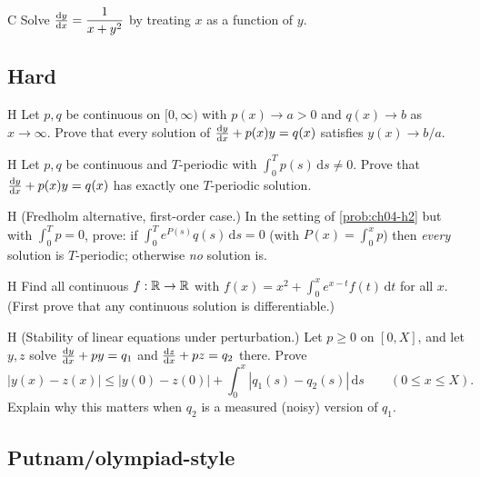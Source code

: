 \begin{problem}{C}\label{prob:ch04-c8}
Solve $\frac{\mathrm{d}y}{\mathrm{d}x} = \dfrac{1}{x + y^2}$ by treating $x$ as a function of $y$.
\end{problem}

\subsection*{Hard}

\begin{problem}{H}\label{prob:ch04-h1}
Let $p, q$ be continuous on $[0,\infty)$ with $p(x)\to a>0$ and $q(x)\to b$ as
$x\to\infty$. Prove that every solution of $\frac{\mathrm{d}y}{\mathrm{d}x} + p(x)y = q(x)$ satisfies
$y(x)\to b/a$.
\end{problem}

\begin{problem}{H}\label{prob:ch04-h2}
Let $p,q$ be continuous and $T$-periodic with $\int_0^Tp(s)\,\mathrm{d}s\neq0$.
Prove that $\frac{\mathrm{d}y}{\mathrm{d}x} + p(x)y = q(x)$ has exactly one $T$-periodic solution.
\end{problem}

\begin{problem}{H}\label{prob:ch04-h3}
(Fredholm alternative, first-order case.) In the setting of \cref{prob:ch04-h2}
but with $\int_0^Tp = 0$, prove: if
$\int_0^Te^{P(s)}q(s)\,\mathrm{d}s = 0$ (with $P(x) = \int_0^xp$) then
\emph{every} solution is $T$-periodic; otherwise \emph{no} solution is.
\end{problem}

\begin{problem}{H}\label{prob:ch04-h4}
Find all continuous $f:\mathbb{R}\to\mathbb{R}$ with
$\displaystyle f(x) = x^2 + \int_0^x e^{x-t}f(t)\,\mathrm{d}t$ for all $x$. (First
prove that any continuous solution is differentiable.)
\end{problem}

\begin{problem}{H}\label{prob:ch04-h5}
(Stability of linear equations under perturbation.) Let $p\ge 0$ on $[0,X]$,
and let $y, z$ solve $\frac{\mathrm{d}y}{\mathrm{d}x} + py = q_1$ and $\frac{\mathrm{d}z}{\mathrm{d}x} + pz = q_2$ there. Prove
\[
  |y(x) - z(x)|\le |y(0) - z(0)| + \int_0^x|q_1(s) - q_2(s)|\,\mathrm{d}s
  \qquad(0\le x\le X).
\]
Explain why this matters when $q_2$ is a measured (noisy) version of $q_1$.
\end{problem}

\subsection*{Putnam/olympiad-style}

